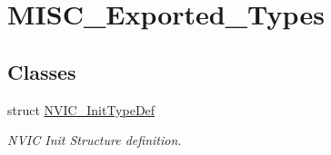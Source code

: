 \hypertarget{group__MISC__Exported__Types}{
\section{MISC\_\-Exported\_\-Types}
\label{group__MISC__Exported__Types}
}
\subsection*{Classes}
\begin{DoxyCompactItemize}
\item 
struct \hyperlink{structNVIC__InitTypeDef}{NVIC\_\-InitTypeDef}
\begin{DoxyCompactList}\small\item\em NVIC Init Structure definition. \item\end{DoxyCompactList}\end{DoxyCompactItemize}
